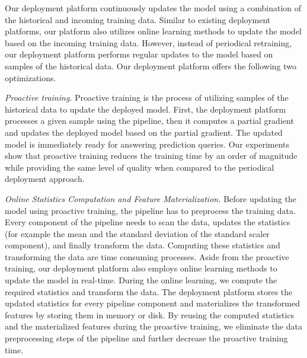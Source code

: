 
Our deployment platform continuously updates the model using a combination of the historical and incoming training data.
Similar to existing deployment platforms, our platform also utilizes online learning methods to update the model based on the incoming training data.
However, instead of periodical retraining, our deployment platform performs regular updates to the model based on samples of the historical data.
Our deployment platform offers the following two optimizations.

\textit{Proactive training.}
Proactive training is the process of utilizing samples of the historical data to update the deployed model.
First, the deployment platform processes a given sample using the pipeline, then it computes a partial gradient and updates the deployed model based on the partial gradient.
The updated model is immediately ready for answering prediction queries.
Our experiments show that proactive training reduces the training time by an order of magnitude while providing the same level of quality when compared to the periodical deployment approach.

\textit{Online Statistics Computation and Feature Materialization.}
Before updating the model using proactive training, the pipeline has to preprocess the training data.
Every component of the pipeline needs to scan the data, updates the statistics (for example the mean and the standard deviation of the standard scaler component), and finally transform the data.
Computing these statistics and transforming the data are time consuming processes.
Aside from the proactive training, our deployment platform also employs online learning methods to update the model in real-time.
During the online learning, we compute the required statistics and transform the data.
The deployment platform stores the updated statistics for every pipeline component and materializes the transformed features by storing them in memory or disk.
By reusing the computed statistics and the materialized features during the proactive training, we eliminate the data preprocessing steps of the pipeline and further decrease the proactive training time.

